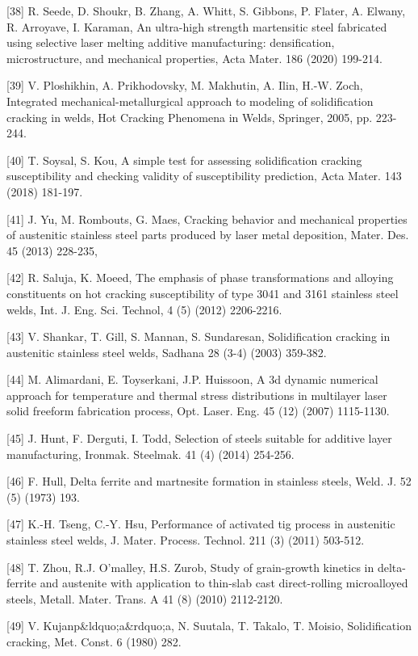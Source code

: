 \documentclass[10pt]{article}
\begin{document}
[38] R. Seede, D. Shoukr, B. Zhang, A. Whitt, S. Gibbons, P. Flater, A. Elwany, R. Arroyave, I. Karaman, An ultra-high strength martensitic steel fabricated using selective laser melting additive manufacturing: densification, microstructure, and mechanical properties, Acta Mater. 186 (2020) 199-214.

[39] V. Ploshikhin, A. Prikhodovsky, M. Makhutin, A. Ilin, H.-W. Zoch, Integrated mechanical-metallurgical approach to modeling of solidification cracking in welds, Hot Cracking Phenomena in Welds, Springer, 2005, pp. 223-244.

[40] T. Soysal, S. Kou, A simple test for assessing solidification cracking susceptibility and checking validity of susceptibility prediction, Acta Mater. 143 (2018) 181-197.

[41] J. Yu, M. Rombouts, G. Maes, Cracking behavior and mechanical properties of austenitic stainless steel parts produced by laser metal deposition, Mater. Des. 45 (2013) 228-235,

[42] R. Saluja, K. Moeed, The emphasis of phase transformations and alloying constituents on hot cracking susceptibility of type 3041 and 3161 stainless steel welds, Int. J. Eng. Sci. Technol, 4 (5) (2012) 2206-2216.

[43] V. Shankar, T. Gill, S. Mannan, S. Sundaresan, Solidification cracking in austenitic stainless steel welds, Sadhana 28 (3-4) (2003) 359-382.

[44] M. Alimardani, E. Toyserkani, J.P. Huissoon, A 3d dynamic numerical approach for temperature and thermal stress distributions in multilayer laser solid freeform fabrication process, Opt. Laser. Eng. 45 (12) (2007) 1115-1130.

[45] J. Hunt, F. Derguti, I. Todd, Selection of steels suitable for additive layer manufacturing, Ironmak. Steelmak. 41 (4) (2014) 254-256.

[46] F. Hull, Delta ferrite and martnesite formation in stainless steels, Weld. J. 52 (5) (1973) 193.

[47] K.-H. Tseng, C.-Y. Hsu, Performance of activated tig process in austenitic stainless steel welds, J. Mater. Process. Technol. 211 (3) (2011) 503-512.

[48] T. Zhou, R.J. O'malley, H.S. Zurob, Study of grain-growth kinetics in delta-ferrite and austenite with application to thin-slab cast direct-rolling microalloyed steels, Metall. Mater. Trans. A 41 (8) (2010) 2112-2120.

[49] V. Kujanp\&ldquo;a\&rdquo;a, N. Suutala, T. Takalo, T. Moisio, Solidification cracking, Met. Const. 6 (1980) 282.
\end{document}
